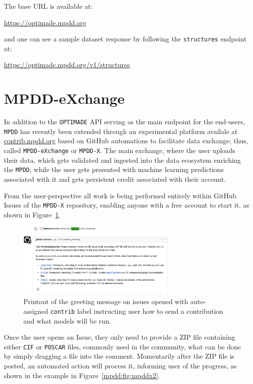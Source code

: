 The base URL is available at:

\hspace{24pt} \href{https://optimade.mpdd.org}{https://optimade.mpdd.org}

and one can see a sample dataset response by following the \texttt{structures} endpoint at:

\hspace{24pt} \href{https://optimade.mpdd.org/v1/structures}{https://optimade.mpdd.org/v1/structures}


\section{MPDD-eXchange} \label{mpdd:sec:mpddx}

In addition to the \texttt{OPTIMADE} API serving as the main endpoint for the end-users, \texttt{MPDD} has recently been extended through an experimental platform availale at \href{https://contrib.mpdd.org}{contrib.mpdd.org} based on GitHub automations to facilitate data exchange; thus, called \texttt{MPDD-eXchange} or \texttt{MPDD-X}. The main exchange, where the user uploads their data, which gets validated and ingested into the data ecosystem enriching the \texttt{MPDD}; while the user gets presented with machine learning predictions associated with it and gets persistent credit associated with their account. 

From the user-perspective all work is being performed entirely within GitHub Issues of the \texttt{MPDD-X} repository, enabling anyone with a free account to start it, as shown in Figure~\ref{mpdd:fig:mpddx1}. 

\begin{figure}[H]
    \centering
    \includegraphics[width=0.7\textwidth]{mpdd/mpddx1.png}
    \caption{Printout of the greeting message on issues opened with auto-assigned \texttt{contrib} label instructing user how to send a contribution and what models will be run.}
    \label{mpdd:fig:mpddx1}
\end{figure}

Once the user opens an Issue, they only need to provide a ZIP file containing either \texttt{CIF} \cite{Hall1991TheCrystallography} or \texttt{POSCAR} \cite{VASPPOSCAR} files, commonly used in the community, what can be done by simply dragging a file into the comment. Momentarily after the ZIP file is posted, an automated action will process it, informing user of the progress, as shown in the example in Figure~\ref{mpdd:fig:mpddx2}.

